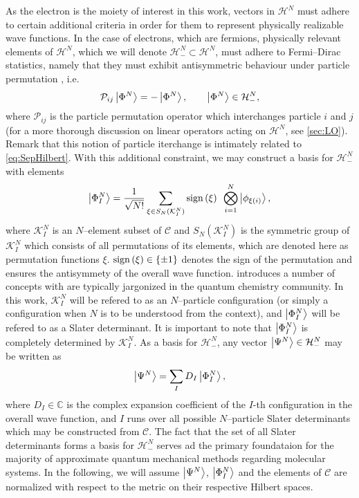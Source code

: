 As the electron is the moiety of interest in this work, vectors in $\mathcal{H}^N$ must adhere to certain additional 
criteria in order for them to represent physically realizable wave functions. In the case of electrons, which are 
fermions, physically relevant elements of $\mathcal{H}^N$, which we will denote $\mathcal{H}^N_- \subset \mathcal{H}^N$, must 
adhere to Fermi--Dirac statistics, namely that they must exhibit antisymmetric behaviour under particle permutation
\cite{Walecka12_book,Schuck04_book}, i.e.
\begin{equation}
  \label{eq:FermiDirac}
  \mathcal{P}_{ij} \left\vert \Phi^N \right\rangle = -\left\vert \Phi^N \right\rangle, \qquad \left\vert \Phi^N \right\rangle \in \mathcal{H}^N_-,
\end{equation} 
where $\mathcal{P}_{ij}$ is the particle permutation operator which interchanges particle $i$ and $j$ 
(for a more thorough discussion on linear operators acting on $\mathcal{H}^N$, see \cref{sec:LO}). Remark
that this notion of particle iterchange is intimately related to \cref{eq:SepHilbert}. With this additional
constraint, we may construct a basis for $\mathcal{H}^N_-$ with elements
\begin{equation}
  \label{eq:SlaterDet}
  \left\vert \Phi^N_I \right\rangle = \frac{1}{\sqrt{N!}} \sum_{\xi \in S_N(\mathcal{K}^N_I)} \mathrm{sign}\left( \xi \right) \text{ } \bigotimes_{i = 1 }^N \left\vert \phi_{\xi(i)} \right\rangle,
\end{equation}
where $\mathcal{K}_I^N$ is an $N$--element subset of $\mathcal{C}$ and $S_N(\mathcal{K}_I^N)$ is the symmetric group
of $\mathcal{K}_I^N$ which consists of all permutations of its elements, which are denoted here as permutation
functions $\xi$. $\mathrm{sign}\left( \xi \right) \in \{ \pm 1 \}$ denotes the sign of the permutation and ensures the antisymmety of
the overall wave function.  introduces a number of concepts with are typically jargonized 
in the quantum chemistry community. In this work, $\mathcal{K}_I^N$ will be refered to as an $N$--particle
configuration (or simply a configuration when $N$ is to be understood from the context), and $\left\vert \Phi^N_I \right\rangle$
will be refered to as a Slater determinant. It is important to note that $\left\vert \Phi^N_I \right\rangle$ is completely 
determined by $\mathcal{K}_I^N$. As a basis for $\mathcal{H}^N_-$, any vector $\left\vert \Psi^N \right\rangle \in \mathcal{H}^N_-$
may be written as \cite{Ostlund12_book}
\begin{equation}
\left\vert \Psi^N \right\rangle = \sum_I D_I \left\vert \Phi^N_I \right\rangle,
\end{equation}
where $D_I\in\mathbb C$ is the complex expansion coefficient of the $I$-th configuration in the overall wave function,
and $I$ runs over all possible $N$--particle Slater determinants which may be constructed from $\mathcal{C}$.
The fact that the set of all Slater determinants forms a basis for $\mathcal{H}^N_-$
serves ad the primary foundataion for the majority of approximate quantum mechanical methods regarding molecular
systems. In the following, we will assume $\left\vert \Psi^N \right\rangle$, $\left\vert \Phi^N_I \right\rangle$ and the elements of $\mathcal{C}$ are normalized 
with respect to the metric on their respective Hilbert spaces.

